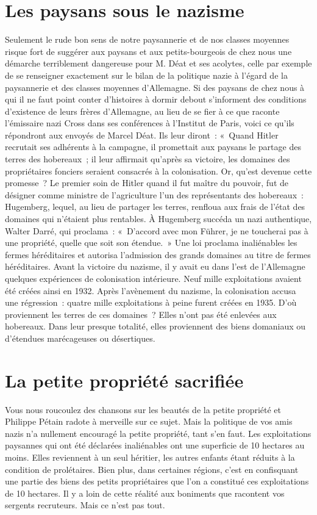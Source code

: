 \documentclass[french,twoside]{book} %
\begin{document}
\section[Les paysans sous le nazisme]{Les paysans sous le nazisme}
\noindent Seulement le rude bon sens de notre paysannerie et de nos classes moyennes risque fort de suggérer aux paysans et aux petits-bourgeois de chez nous une démarche terriblement dangereuse pour M. Déat et ses acolytes, celle par exemple de se renseigner exactement sur le bilan de la politique nazie à l’égard de la paysannerie et des classes moyennes d’Allemagne. Si des paysans de chez nous à qui il ne faut point conter d’histoires à dormir debout s’informent des conditions d’existence de leurs frères d’Allemagne, au lieu de se fier à ce que raconte l’émissaire nazi Cross dans ses conférences à l’Institut de Paris, voici ce qu’ils répondront aux envoyés de Marcel Déat. Ils leur diront : « Quand Hitler recrutait ses adhérents à la campagne, il promettait aux paysans le partage des terres des hobereaux ; il leur affirmait qu’après sa victoire, les domaines des propriétaires fonciers seraient consacrés à la colonisation. Or, qu’est devenue cette promesse ? Le premier soin de Hitler quand il fut maître du pouvoir, fut de désigner comme ministre de l’agriculture l’un des représentants des hobereaux : Hugemberg, lequel, au lieu de partager les terres, renfloua aux frais de l’état des domaines qui n’étaient plus rentables. À Hugemberg succéda un nazi authentique, Walter Darré, qui proclama : « D’accord avec mon Führer, je ne toucherai pas à une propriété, quelle que soit son étendue. » Une loi proclama inaliénables les fermes héréditaires et autorisa l’admission des grands domaines au titre de fermes héréditaires. Avant la victoire du nazisme, il y avait eu dans l’est de l’Allemagne quelques expériences de colonisation intérieure. Neuf mille exploitations avaient été créées ainsi en 1932. Après l’avènement du nazisme, la colonisation accusa une régression : quatre mille exploitations à peine furent créées en 1935. D’où proviennent les terres de ces domaines ? Elles n’ont pas été enlevées aux hobereaux. Dans leur presque totalité, elles proviennent des biens domaniaux ou d’étendues marécageuses ou désertiques.
\section[La petite propriété sacrifiée]{La petite propriété sacrifiée}
\noindent Vous nous roucoulez des chansons sur les beautés de la petite propriété et Philippe Pétain radote à merveille sur ce sujet. Mais la politique de vos amis nazis n’a nullement encouragé la petite propriété, tant s’en faut. Les exploitations paysannes qui ont été déclarées inaliénables ont une superficie de 10 hectares au moins. Elles reviennent à un seul héritier, les autres enfants étant réduits à la condition de prolétaires. Bien plus, dans certaines régions, c’est en confisquant une partie des biens des petits propriétaires que l’on a constitué ces exploitations de 10 hectares. Il y a loin de cette réalité aux boniments que racontent vos sergents recruteurs. Mais ce n’est pas tout.
\end{document}
